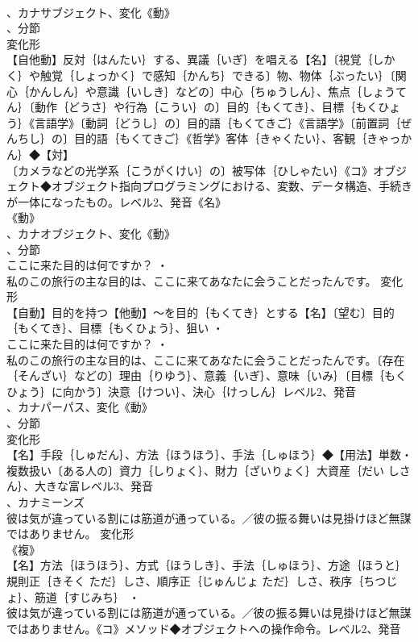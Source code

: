 \documentclass[8pt]{extreport}
\begin{document}
\begin{CJK}{UTF8}{min}
\\	、カナサブジェクト、変化《動》
\\	、分節
\\	変化形 
\\	【自他動】反対｛はんたい｝する、異議｛いぎ｝を唱える【名】〔視覚｛しかく｝や触覚｛しょっかく｝で感知｛かんち｝できる〕物、物体｛ぶったい｝〔関心｛かんしん｝や意識｛いしき｝などの〕中心｛ちゅうしん｝、焦点｛しょうてん｝〔動作｛どうさ｝や行為｛こうい｝の〕目的｛もくてき｝、目標｛もくひょう｝《言語学》〔動詞｛どうし｝の〕目的語｛もくてきご｝《言語学》〔前置詞｛ぜんちし｝の〕目的語｛もくてきご｝《哲学》客体｛きゃくたい｝、客観｛きゃっかん｝◆【対】
\\	〔カメラなどの光学系｛こうがくけい｝の〕被写体｛ひしゃたい｝《コ》オブジェクト◆オブジェクト指向プログラミングにおける、変数、データ構造、手続きが一体になったもの。レベル2、発音《名》
\\	《動》
\\	、カナオブジェクト、変化《動》
\\	、分節
\\	ここに来た目的は何ですか？ ・
\\	私のこの旅行の主な目的は、ここに来てあなたに会うことだったんです。	変化形 
\\	【自動】目的を持つ【他動】～を目的｛もくてき｝とする【名】〔望む〕目的｛もくてき｝、目標｛もくひょう｝、狙い ・
\\	ここに来た目的は何ですか？ ・
\\	私のこの旅行の主な目的は、ここに来てあなたに会うことだったんです。〔存在｛そんざい｝などの〕理由｛りゆう｝、意義｛いぎ｝、意味｛いみ｝〔目標｛もくひょう｝に向かう〕決意｛けつい｝、決心｛けっしん｝レベル2、発音
\\	、カナパーパス、変化《動》
\\	、分節
\\	変化形 
\\	【名】手段｛しゅだん｝、方法｛ほうほう｝、手法｛しゅほう｝◆【用法】単数・複数扱い〔ある人の〕資力｛しりょく｝、財力｛ざいりょく｝大資産｛だい しさん｝、大きな富レベル3、発音
\\	、カナミーンズ
\\	彼は気が違っている割には筋道が通っている。／彼の振る舞いは見掛けほど無謀ではありません。	変化形 
\\	《複》
\\	【名】方法｛ほうほう｝、方式｛ほうしき｝、手法｛しゅほう｝、方途｛ほうと｝規則正｛きそく ただ｝しさ、順序正｛じゅんじょ ただ｝しさ、秩序｛ちつじょ｝、筋道｛すじみち｝ ・
\\	彼は気が違っている割には筋道が通っている。／彼の振る舞いは見掛けほど無謀ではありません。《コ》メソッド◆オブジェクトへの操作命令。レベル2、発音

\end{CJK}
\end{document}
